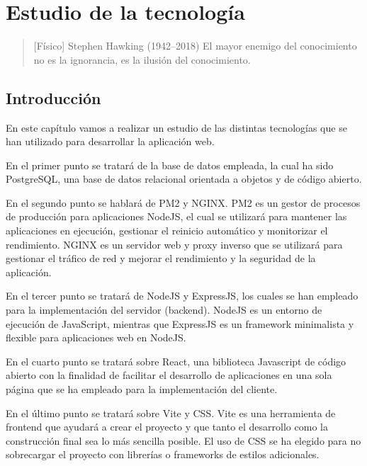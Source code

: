 \chapter{Estudio de la tecnología}

\begin{quotation} [Físico] {Stephen Hawking (1942--2018)}
El mayor enemigo del conocimiento no es la ignorancia, es la ilusión del conocimiento.
\end{quotation}

\begin{abstract}
Vamos a explicar las diferentes tecnologías que hemos utilizado para el desarrollo de la aplicación.
\end{abstract}

\section{Introducción}

En este capítulo vamos a realizar un estudio de las distintas tecnologías que se han utilizado para desarrollar la aplicación web.

En el primer punto se tratará de la base de datos empleada, la cual ha sido PostgreSQL, una base de datos relacional orientada a objetos y de código abierto.

En el segundo punto se hablará de PM2 y NGINX. PM2 es un gestor de procesos de producción para aplicaciones NodeJS, el cual se utilizará para mantener las aplicaciones en ejecución, gestionar el reinicio automático y monitorizar el rendimiento. NGINX es un servidor web y proxy inverso que se utilizará para gestionar el tráfico de red y mejorar el rendimiento y la seguridad de la aplicación.

En el tercer punto se tratará de NodeJS y ExpressJS, los cuales se han empleado para la implementación del servidor (backend). NodeJS es un entorno de ejecución de JavaScript, mientras que ExpressJS es un framework minimalista y flexible para aplicaciones web en NodeJS.

En el cuarto punto se tratará sobre React, una biblioteca Javascript de código abierto con la finalidad de facilitar el desarrollo de aplicaciones en una sola página que se ha empleado para la implementación del cliente.

En el último punto se tratará sobre Vite y CSS. Vite es una herramienta de frontend que ayudará a crear el proyecto y que tanto el desarrollo como la construcción final sea lo más sencilla posible. El uso de CSS se ha elegido para no sobrecargar el proyecto con librerías o frameworks de estilos adicionales.

